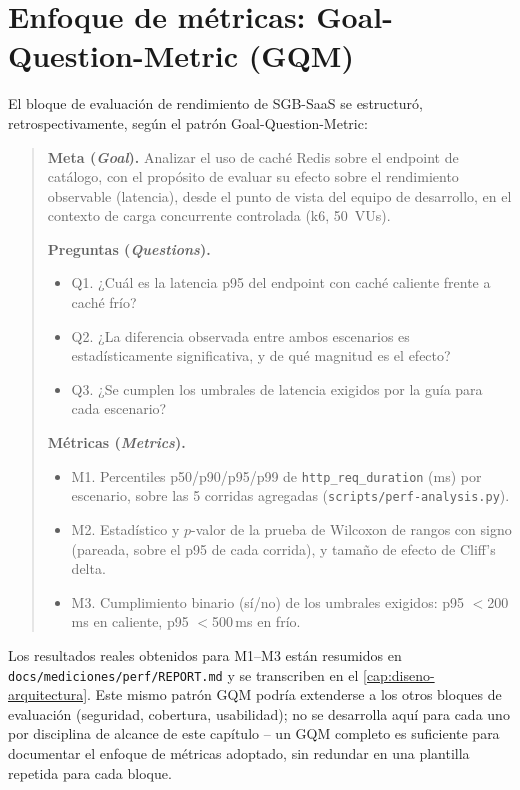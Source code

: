 \section{Enfoque de métricas: Goal-Question-Metric (GQM)}

El bloque de evaluación de rendimiento de SGB-SaaS se estructuró,
retrospectivamente, según el patrón Goal-Question-Metric:

\begin{quote}
\textbf{Meta (\emph{Goal}).} Analizar el uso de caché Redis sobre el
endpoint de catálogo, con el propósito de evaluar su efecto sobre el
rendimiento observable (latencia), desde el punto de vista del equipo de
desarrollo, en el contexto de carga concurrente controlada (k6, 50~VUs).

\textbf{Preguntas (\emph{Questions}).}
\begin{itemize}[leftmargin=1cm]
  \item Q1. ¿Cuál es la latencia p95 del endpoint con caché caliente
    frente a caché frío?
  \item Q2. ¿La diferencia observada entre ambos escenarios es
    estadísticamente significativa, y de qué magnitud es el efecto?
  \item Q3. ¿Se cumplen los umbrales de latencia exigidos por la guía
    para cada escenario?
\end{itemize}

\textbf{Métricas (\emph{Metrics}).}
\begin{itemize}[leftmargin=1cm]
  \item M1. Percentiles p50/p90/p95/p99 de \texttt{http\_req\_duration}
    (ms) por escenario, sobre las 5 corridas agregadas
    (\texttt{scripts/perf-analysis.py}).
  \item M2. Estadístico y $p$-valor de la prueba de Wilcoxon de rangos
    con signo (pareada, sobre el p95 de cada corrida), y tamaño de
    efecto de Cliff's delta.
  \item M3. Cumplimiento binario (sí/no) de los umbrales exigidos: p95
    $<$200\,ms en caliente, p95 $<$500\,ms en frío.
\end{itemize}
\end{quote}

Los resultados reales obtenidos para M1--M3 están resumidos en
\texttt{docs/mediciones/perf/REPORT.md} y se transcriben en el
\autoref{cap:diseno-arquitectura}. Este mismo patrón GQM podría
extenderse a los otros bloques de evaluación (seguridad, cobertura,
usabilidad); no se desarrolla aquí para cada uno por disciplina de
alcance de este capítulo -- un GQM completo es suficiente para
documentar el enfoque de métricas adoptado, sin redundar en una
plantilla repetida para cada bloque.

